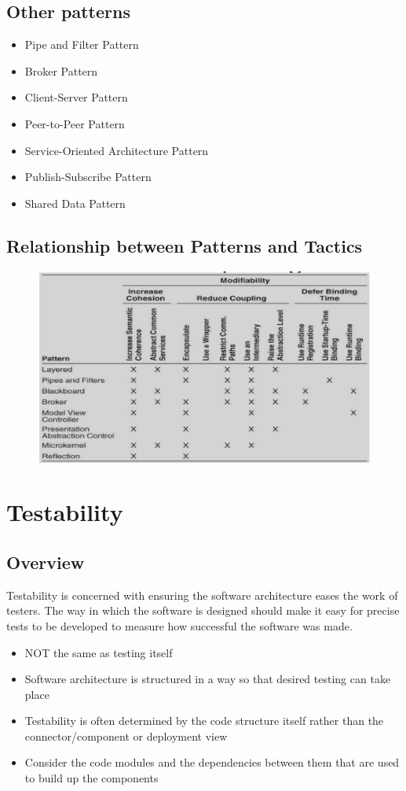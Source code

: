 \documentclass[a4paper]{report}
\begin{document}
\section{Other patterns}
\begin{itemize}
\item
  Pipe and Filter Pattern
\item
  Broker Pattern
\item
  Client-Server Pattern
\item
  Peer-to-Peer Pattern
\item
  Service-Oriented Architecture Pattern
\item
  Publish-Subscribe Pattern
\item
  Shared Data Pattern
\end{itemize}

\section{Relationship between Patterns and Tactics}

\begin{figure}[H]
\centering
  \includegraphics[width=1\linewidth]
  {images/relationship.png}
\end{figure}

\chapter{Testability}
\section{Overview}
Testability is concerned with ensuring the software architecture eases the work of testers. The way in which the software is designed should make it easy for precise tests to be developed to measure how successful the software was made.
\begin{itemize}
\item NOT the same as testing itself
\item Software architecture is structured in a way so that desired testing can take place
\item Testability is often determined by the code structure itself rather than the connector/component or deployment view
\item Consider the code modules and the dependencies between them that are used to build up the components
\end{itemize}
\end{document}
